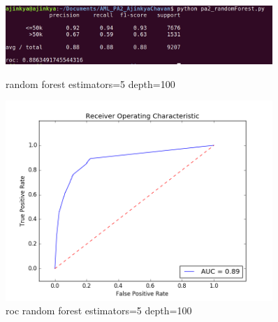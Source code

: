 \documentclass{article}
\begin{document}
\begin{figure}
    \centering
    \begin{minipage}{0.45\textwidth}
        \centering
        \includegraphics[width=0.9\textwidth]{random_5_100.png} %
        \caption{random forest estimators=5 depth=100}
    \end{minipage}\hfill
    \begin{minipage}{0.45\textwidth}
        \centering
        \includegraphics[width=0.9\textwidth]{roc_random_5_100.png} %
        \caption{roc random forest estimators=5 depth=100}
    \end{minipage}
\end{figure}
\end{document}
